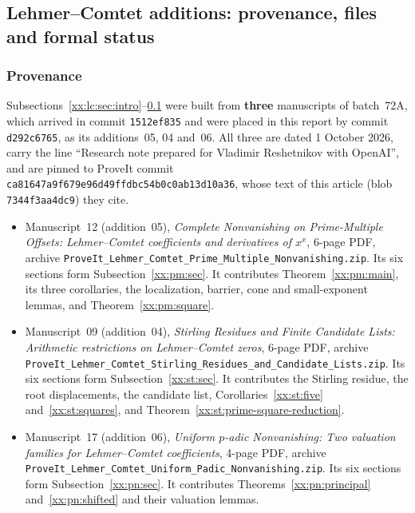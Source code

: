 \documentclass[11pt,a4paper]{article}
\numberwithin{equation}{section}
\theoremstyle{definition}
\theoremstyle{remark}
\theoremstyle{plain}
\begin{document}
\subsection{Lehmer--Comtet additions: provenance, files and formal status}\label{xx:lc:sec:provenance}

\subsubsection{Provenance}

Subsections~\ref{xx:lc:sec:intro}--\ref{xx:lc:sec:provenance} were built from
\textbf{three} manuscripts of batch~72A, which arrived in commit
\texttt{1512ef835} and were placed in this report by commit
\texttt{d292c6765}, as its additions~05, 04 and~06.  All three are dated
1 October 2026, carry the line ``Research note prepared for Vladimir
Reshetnikov with OpenAI'', and are pinned to ProveIt commit
\texttt{ca81647a9f679e96\allowbreak d49ffdbc54b0c0ab\allowbreak 13d10a36},
whose text of this article (blob \texttt{7344f3aa4dc9}) they cite.
\begin{itemize}[leftmargin=1.4em,itemsep=1pt]
\item Manuscript~12 (addition~05), \emph{Complete Nonvanishing on
 Prime-Multiple Offsets: Lehmer--Comtet coefficients and derivatives of $x^x$},
 6-page PDF, archive
 \texttt{ProveIt\_\allowbreak Lehmer\_\allowbreak Comtet\_\allowbreak Prime\_\allowbreak Multiple\_\allowbreak Nonvanishing.zip}.
 Its six sections form
 Subsection~\ref{xx:pm:sec}.  It contributes Theorem~\ref{xx:pm:main}, its
 three corollaries, the localization, barrier, cone and small-exponent lemmas,
 and Theorem~\ref{xx:pm:square}.
\item Manuscript~09 (addition~04), \emph{Stirling Residues and Finite
 Candidate Lists: Arithmetic restrictions on Lehmer--Comtet zeros}, 6-page PDF,
 archive
 \texttt{ProveIt\_\allowbreak Lehmer\_\allowbreak Comtet\_\allowbreak Stirling\_\allowbreak Residues\_\allowbreak and\_\allowbreak Candidate\_\allowbreak Lists.zip}.
 Its six sections form
 Subsection~\ref{xx:st:sec}.  It contributes the Stirling residue, the root
 displacements, the candidate list, Corollaries~\ref{xx:st:five}
 and~\ref{xx:st:squares}, and Theorem~\ref{xx:st:prime-square-reduction}.
\item Manuscript~17 (addition~06), \emph{Uniform $p$-adic Nonvanishing: Two
 valuation families for Lehmer--Comtet coefficients}, 4-page PDF, archive
 \texttt{ProveIt\_\allowbreak Lehmer\_\allowbreak Comtet\_\allowbreak Uniform\_\allowbreak Padic\_\allowbreak Nonvanishing.zip}.  Its six sections form
 Subsection~\ref{xx:pn:sec}.  It contributes Theorems~\ref{xx:pn:principal}
 and~\ref{xx:pn:shifted} and their valuation lemmas.
\end{itemize}
\end{document}

